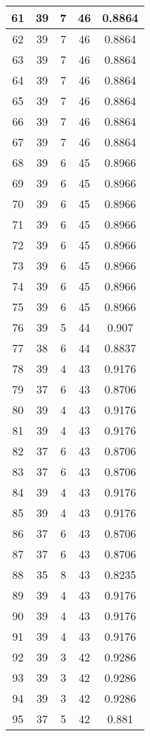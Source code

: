 \documentclass[letterpaper, 12pt]{article}
\begin{document}
\begin{longtable}{|c|c|c|c|c|}
\hline
61 & 39 & 7 & 46 & 0.8864 \\
\hline
62 & 39 & 7 & 46 & 0.8864 \\
\hline
63 & 39 & 7 & 46 & 0.8864 \\
\hline
64 & 39 & 7 & 46 & 0.8864 \\
\hline
65 & 39 & 7 & 46 & 0.8864 \\
\hline
66 & 39 & 7 & 46 & 0.8864 \\
\hline
67 & 39 & 7 & 46 & 0.8864 \\
\hline
68 & 39 & 6 & 45 & 0.8966 \\
\hline
69 & 39 & 6 & 45 & 0.8966 \\
\hline
70 & 39 & 6 & 45 & 0.8966 \\
\hline
71 & 39 & 6 & 45 & 0.8966 \\
\hline
72 & 39 & 6 & 45 & 0.8966 \\
\hline
73 & 39 & 6 & 45 & 0.8966 \\
\hline
74 & 39 & 6 & 45 & 0.8966 \\
\hline
75 & 39 & 6 & 45 & 0.8966 \\
\hline
76 & 39 & 5 & 44 & 0.907 \\
\hline
77 & 38 & 6 & 44 & 0.8837 \\
\hline
78 & 39 & 4 & 43 & 0.9176 \\
\hline
79 & 37 & 6 & 43 & 0.8706 \\
\hline
80 & 39 & 4 & 43 & 0.9176 \\
\hline
81 & 39 & 4 & 43 & 0.9176 \\
\hline
82 & 37 & 6 & 43 & 0.8706 \\
\hline
83 & 37 & 6 & 43 & 0.8706 \\
\hline
84 & 39 & 4 & 43 & 0.9176 \\
\hline
85 & 39 & 4 & 43 & 0.9176 \\
\hline
86 & 37 & 6 & 43 & 0.8706 \\
\hline
87 & 37 & 6 & 43 & 0.8706 \\
\hline
88 & 35 & 8 & 43 & 0.8235 \\
\hline
89 & 39 & 4 & 43 & 0.9176 \\
\hline
90 & 39 & 4 & 43 & 0.9176 \\
\hline
91 & 39 & 4 & 43 & 0.9176 \\
\hline
92 & 39 & 3 & 42 & 0.9286 \\
\hline
93 & 39 & 3 & 42 & 0.9286 \\
\hline
94 & 39 & 3 & 42 & 0.9286 \\
\hline
95 & 37 & 5 & 42 & 0.881 \\

\end{longtable}
\end{document}

